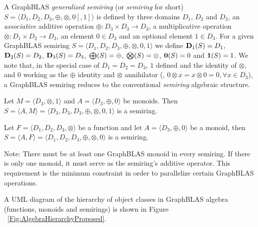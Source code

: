 A GraphBLAS \emph{generalized semiring} (or \emph{semiring} for short)
$S=\langle D_1,D_2,D_3,\oplus,\otimes,0 [,1] \rangle$ is defined by
three domains $D_1$, $D_2$ and $D_3$, an \emph{associative} additive operation $\oplus :
D_3 \times D_3 \rightarrow D_3$, 
a multiplicative operation $\otimes : D_1 \times D_2 \rightarrow
D_3$, an element $0 \in D_3$ and an optional element $1 \in D_3$.
For a given GraphBLAS semiring $S=\langle D_1,
D_2, D_3,\oplus,\otimes,0,1 \rangle$ we define $\bold{D}_1(S) = D_1$,
$\bold{D}_2(S) = D_2$, $\bold{D}_3(S) = D_3$, $\bold{\bigoplus}(S) =
\oplus$, $\bold{\bigotimes}(S) = \otimes$, ${\bf 0}(S) = 0$ and ${\bf 1}(S) =
1$. We note that, in the special case of $D_1 = D_2 = D_3$, $1$ defined and the identity of $\otimes$,
and $0$ working as the $\oplus$ identity and $\otimes$ annihilator (\ie, $0 \otimes x = x
\otimes 0 = 0, \forall x \in D_3$), a GraphBLAS semiring reduces to the
conventional \emph{semiring} algebraic structure.

Let $M = \langle D_3, \otimes,1 \rangle$ and $A = \langle D_3,\oplus,0 \rangle$ be monoids.
Then $S= \langle A,M \rangle = \langle D_3,D_3,D_3,\oplus,\otimes,0,1 \rangle$
is a semiring.

Let $F = \langle D_1,D_2,D_3,\otimes \rangle$ be a function
and let $A = \langle D_3,\oplus,0 \rangle$ be a monoid,
then $S= \langle A,F \rangle = \langle D_1,D_2,D_3,\oplus,\otimes,0 \rangle$
is a semiring.

Note: There must be at least one GraphBLAS monoid in every semiring. If there is only one monoid, it must serve as the semiring's additive operator. This requirement is the minimum constraint in order to parallelize certain GraphBLAS operations.

 

 

A UML diagram of the hierarchy of object classes in GraphBLAS
algebra (functions, monoids and semirings) is shown in 
Figure ~\ref{Fig:AlgebraHierarchyProposed}.

